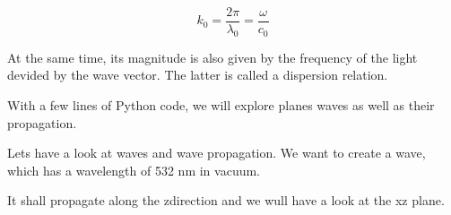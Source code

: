 \documentclass[letterpaper,10pt,english]{sphinxmanual}
\begin{document}
\begin{equation}
k_{0}=\frac{2\pi}{\lambda_{0}}=\frac{\omega}{c_{0}}
\end{equation}

At the same time, its magnitude is also given by the frequency of the light devided by the wave vector. The latter is called a dispersion relation.

With a few lines of Python code, we will explore planes waves as well as their propagation.

{
\begin{sphinxVerbatim}[commandchars=\\\{\}]
\llap{\color{nbsphinxin}[3]:\,\hspace{\fboxrule}\hspace{\fboxsep}} 
\end{sphinxVerbatim}
}

Lets have a look at waves and wave propagation. We want to create a wave, which has a wavelength of 532 nm in vacuum.

{
\begin{sphinxVerbatim}[commandchars=\\\{\}]
\llap{\color{nbsphinxin}[4]:\,\hspace{\fboxrule}\hspace{\fboxsep}}
\end{sphinxVerbatim}
}

It shall propagate along the z\sphinxhyphen{}direction and we wull have a look at the x\sphinxhyphen{}z plane.
\end{document}
